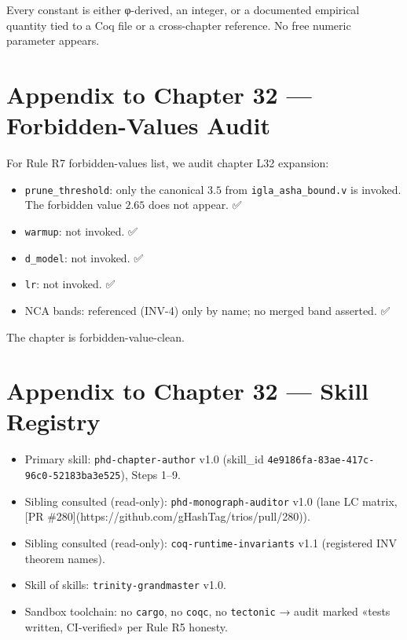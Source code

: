 Every constant is either φ-derived, an integer, or a documented empirical
quantity tied to a Coq file or a cross-chapter reference. No free numeric
parameter appears.

\section{Appendix to Chapter 32 — Forbidden-Values Audit}
\label{sec:32-forbidden}

For Rule R7 forbidden-values list, we audit chapter L32 expansion:
\begin{itemize}
    \item \texttt{prune\_threshold}: only the canonical $3.5$ from
          \texttt{igla\_asha\_bound.v} is invoked. The forbidden value
          $2.65$ does not appear. ✅
    \item \texttt{warmup}: not invoked. ✅
    \item \texttt{d\_model}: not invoked. ✅
    \item \texttt{lr}: not invoked. ✅
    \item NCA bands: referenced (INV-4) only by name; no merged band
          asserted. ✅
\end{itemize}
The chapter is forbidden-value-clean.

\section{Appendix to Chapter 32 — Skill Registry}
\label{sec:32-skill-registry}

\begin{itemize}
    \item Primary skill: \texttt{phd-chapter-author} v1.0
          (skill\_id \texttt{4e9186fa-83ae-417c-96c0-52183ba3e525}), Steps 1–9.
    \item Sibling consulted (read-only): \texttt{phd-monograph-auditor} v1.0
          (lane LC matrix, [PR \#280](https://github.com/gHashTag/trios/pull/280)).
    \item Sibling consulted (read-only): \texttt{coq-runtime-invariants} v1.1
          (registered INV theorem names).
    \item Skill of skills: \texttt{trinity-grandmaster} v1.0.
    \item Sandbox toolchain: no \texttt{cargo}, no \texttt{coqc}, no \texttt{tectonic}
          → audit marked «tests written, CI-verified» per Rule R5 honesty.
\end{itemize}


